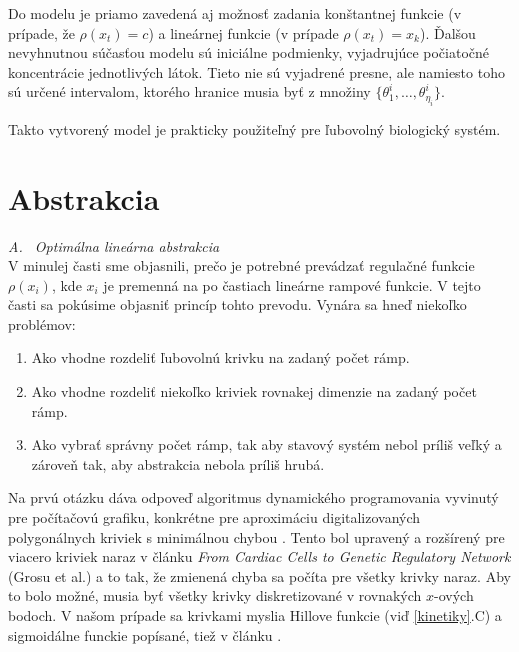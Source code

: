 \documentclass[11pt,final,oneside]{fithesis}
\begin{document}
Do modelu je priamo zaveden\'a aj mo\v znos\v t zadania kon\v stantnej funkcie (v pr\'ipade, \v ze $\rho(x_t) = c$) a line\'arnej funkcie 
(v pr\'ipade $\rho(x_t) = x_k$). \v Dal\v sou nevyhnutnou s\'u\v cas\v tou modelu s\'u inici\'alne podmienky, vyjadruj\'uce 
po\v ciato\v cn\'e koncentr\'acie jednotliv\'ych l\'atok. Tieto nie s\'u vyjadren\'e presne, ale namiesto toho s\'u ur\v cen\'e intervalom, ktor\'eho
hranice musia by\v t z mno\v ziny $\{ \theta_1^i,\dots{},\theta_{\eta_i}^i \}$.

Takto vytvoren\'y model je prakticky pou\v zite\v ln\'y pre \v lubovoln\'y biologick\'y syst\'em.
\cite{HIBI-2009}\cite{HIBI-2010}

\section{Abstrakcia}
\label{sec:abstraction}

\noindent
\textit{A. \ Optim\'alna line\'arna abstrakcia}
\\

V minulej \v casti sme objasnili, pre\v co je potrebn\'e prev\'adza\v t regula\v cn\'e funkcie $\rho(x_i)$, kde $x_i$ je premenn\'a na po \v castiach line\'arne 
rampov\'e funkcie. V tejto \v casti sa pok\'usime objasni\v t princ\'ip tohto prevodu. Vyn\'ara sa hne\v d nieko\v lko probl\'emov:
\begin{enumerate}
\item Ako vhodne rozdeli\v t \v lubovoln\'u krivku na zadan\'y po\v cet r\'amp.
\item Ako vhodne rozdeli\v t nieko\v lko kriviek rovnakej dimenzie na zadan\'y po\v cet r\'amp.
\item Ako vybra\v t spr\'avny po\v cet r\'amp, tak aby stavov\'y syst\'em nebol pr\'ili\v s ve\v lk\'y a z\'arove\v n tak, aby abstrakcia nebola 
pr\'ili\v s hrub\'a.
\end{enumerate}
Na prv\'u ot\'azku d\'ava odpove\v d algoritmus dynamick\'eho programovania vyvinut\'y pre po\v c\'ita\v cov\'u grafiku, konkr\'etne pre aproxim\'aciu
digitalizovan\'ych polygon\'alnych kriviek s minim\'alnou chybou \cite{CURVES}. Tento bol upraven\'y a roz\v s\'iren\'y pre viacero kriviek naraz v 
\v cl\'anku \textit{From Cardiac Cells to Genetic Regulatory Network} (Grosu et al.) \cite{CAV-2011} a to tak, \v ze zmienen\'a chyba sa po\v c\'ita pre
v\v setky krivky naraz. Aby to bolo mo\v zn\'e, musia by\v t v\v setky krivky diskretizovan\'e v rovnak\'ych $x$-ov\'ych bodoch. 
V na\v som pr\'ipade sa krivkami myslia Hillove funkcie (vi\v d \ref{kinetiky}.C) a sigmoid\'alne funckie pop\'isan\'e, tie\v z v \v cl\'anku \cite{CAV-2011}.
\end{document}
